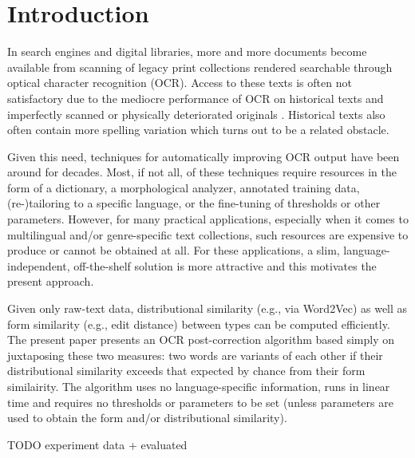 \documentclass{sig-alternate}
\begin{document}


\section{Introduction}
In search engines and digital libraries, more and more documents
become available from scanning of legacy print collections rendered
searchable through optical character recognition (OCR). Access to
these texts is often not satisfactory due to the mediocre performance
of OCR on historical texts and imperfectly scanned or physically
deteriorated originals \cite{ocr:Taghva,ocr:Traub}.  Historical texts
also often contain more spelling variation which turns out to be a
related obstacle.

Given this need, techniques for automatically improving OCR output
have been around for decades. Most, if not all, of these techniques
require resources in the form of a dictionary, a morphological
analyzer, annotated training data, (re-)tailoring to a specific
language, or the fine-tuning of thresholds or other
parameters. However, for many practical applications, especially when
it comes to multilingual and/or genre-specific text collections, such
resources are expensive to produce or cannot be obtained at all.  For
these applications, a slim, language-independent, off-the-shelf
solution is more attractive and this motivates the present approach.

Given only raw-text data, distributional similarity (e.g., via
Word2Vec) as well as form similarity (e.g., edit distance) between
types can be computed efficiently. The present paper presents an OCR
post-correction algorithm based simply on juxtaposing these two
measures: two words are variants of each other if their distributional
similarity exceeds that expected by chance from their form
similairity. The algorithm uses no language-specific information, runs
in linear time and requires no thresholds or parameters to be set
(unless parameters are used to obtain the form and/or distributional
similarity).

TODO experiment data + evaluated




\end{document}
